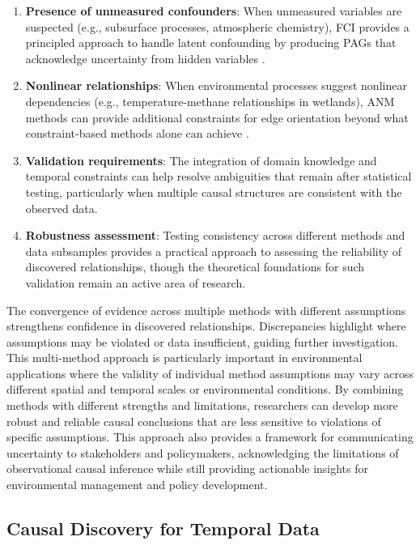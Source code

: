 \begin{enumerate}
	\item \textbf{Presence of unmeasured confounders}: When unmeasured variables are suspected (e.g., subsurface processes, atmospheric chemistry), FCI provides a principled approach to handle latent confounding by producing PAGs that acknowledge uncertainty from hidden variables \cite{Runge2019_2}.

	\item \textbf{Nonlinear relationships}: When environmental processes suggest nonlinear dependencies (e.g., temperature-methane relationships in wetlands), ANM methods can provide additional constraints for edge orientation beyond what constraint-based methods alone can achieve \cite{Peters2014}.

	\item \textbf{Validation requirements}: The integration of domain knowledge and temporal constraints can help resolve ambiguities that remain after statistical testing, particularly when multiple causal structures are consistent with the observed data.

	\item \textbf{Robustness assessment}: Testing consistency across different methods and data subsamples provides a practical approach to assessing the reliability of discovered relationships, though the theoretical foundations for such validation remain an active area of research.
\end{enumerate}

The convergence of evidence across multiple methods with different assumptions strengthens confidence in discovered relationships. Discrepancies highlight where assumptions may be violated or data insufficient, guiding further investigation. This multi-method approach is particularly important in environmental applications where the validity of individual method assumptions may vary across different spatial and temporal scales or environmental conditions. By combining methods with different strengths and limitations, researchers can develop more robust and reliable causal conclusions that are less sensitive to violations of specific assumptions. This approach also provides a framework for communicating uncertainty to stakeholders and policymakers, acknowledging the limitations of observational causal inference while still providing actionable insights for environmental management and policy development.

\subsection{Causal Discovery for Temporal Data}
\label{subsec:temporal_causal}

